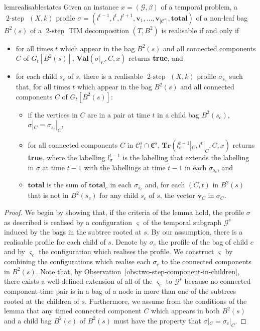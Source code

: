 \documentclass[a4paper,UKenglish,cleveref, autoref, thm-restate]{lipics-v2021} %
\DeclareMathOperator{\twostep}{2-step}
\begin{document}
\begin{toappendix}
\begin{restatable}{lem}{realisablestates}\label{lem:realisable-states}
     Given an instance $x=(\mathcal{G},\beta)$ of a temporal problem, a $\twostep$ $(X,k)$ profile $\sigma=(l^{t-1}, l^t, l^{t+1}, \textbf{v}_{1},\ldots, \textbf{v}_{|\mathcal{C}^s|}, \textbf{total})$ of a non-leaf bag $B^2(s)$ of a $\twostep$ TIM decomposition $(T,B^2)$ is realisable if and only if 
   \begin{itemize}
       \item for all times $t$ which appear in the bag $B^2(s)$ and all connected components $C$ of $G_{t}[B^2(s)]$, $\textbf{Val}(\sigma|_{C},C,x)$ returns \textbf{true}, and 
       \item for each child $s_c$ of $s$, there is a realisable $\twostep$ $(X,k)$ profile $\sigma_{s_c}$ such that, for all times $t$ which appear in the bag $B^2(s)$ and all connected components $C$ of $G_{t}[B^2(s)]$:
        \begin{itemize}
            \item if the vertices in $C$ are in a pair at time $t$ in a child bag $B^2(s_c)$, $\sigma|_C=\sigma_{s_c}|_C$,
            \item for all connected components $C$ in $\mathcal{C}^s_t \cap \mathfrak{C}^s$, $\textbf{Tr}(l^{t-1}_{\sigma}|_C,l^t|_C,C,x)$ returns \textbf{true}, where the labelling $l^{t-1}_{\sigma}$ is the labelling that extends the labelling in $\sigma$ at time $t-1$ with the labellings at time $t-1$ in each $\sigma_{s_c}$, and
            \item $\textbf{total}$ is the sum of $\textbf{total}_c$ in each $\sigma_{s_c}$ and, for each $(C,t)$ in $B^2(s)$ that is not in $B^2(s_c)$ for any child $s_c$ of $s$, the vector $\textbf{v}_C$ in $\sigma_C$.
        \end{itemize}
        \end{itemize}
\end{restatable}
\begin{proof}
    We begin by showing that, if the criteria of the lemma hold, the profile $\sigma$ as described is realised by a configuration $\varsigma$ of the temporal subgraph $\mathcal{G}^s$ induced by the bags in the subtree rooted at $s$. By our assumption, there is a realisable profile for each child of $s$. Denote by $\sigma_c$ the profile of the bag of child $c$ and by  $\varsigma_c$ the configuration which realises the profile. We construct $\varsigma$ by combining the configurations which realise each $\sigma_c$ to the connected components in $B^2(s)$. Note that, by Observation~\ref{obs:two-step-component-in-children}, there exists a well-defined extension of all of the $\varsigma_c$ to $\mathcal{G}^s$ because no connected component-time pair is in a bag of a node in more than one of the subtrees rooted at the children of $s$. Furthermore, we assume from the conditions of the lemma that any timed connected component $C$ which appears in both $B^2(s)$ and a child bag $B^2(c)$ of $B^2(s)$ must have the property that $\sigma|_C=\sigma_c|_C$. 

\end{proof}
\end{toappendix}
\end{document}
